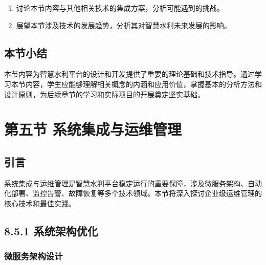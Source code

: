 \begin{enumerate}
\def\labelenumi{\arabic{enumi}.}
\tightlist
\item
  讨论本节内容与其他相关技术的集成方案，分析可能遇到的挑战。
\item
  展望本节涉及技术的发展趋势，分析其对智慧水利未来发展的影响。
\end{enumerate}

\hypertarget{ux672cux8282ux5c0fux7ed3-2}{%
\subsection{本节小结}\label{ux672cux8282ux5c0fux7ed3-2}}

本节内容为智慧水利平台的设计和开发提供了重要的理论基础和技术指导。通过学习本节内容，学生应能够理解相关概念的内涵和应用价值，掌握基本的分析方法和设计原则，为后续章节的学习和实际项目的开展奠定坚实基础。

\hypertarget{ux7b2cux4e94ux8282-ux7cfbux7edfux96c6ux6210ux4e0eux8fd0ux7ef4ux7ba1ux7406}{%
\section{第五节 系统集成与运维管理}\label{ux7b2cux4e94ux8282-ux7cfbux7edfux96c6ux6210ux4e0eux8fd0ux7ef4ux7ba1ux7406}}

\hypertarget{ux5f15ux8a00-4}{%
\subsection{引言}\label{ux5f15ux8a00-4}}

系统集成与运维管理是智慧水利平台稳定运行的重要保障，涉及微服务架构、自动化部署、监控告警、故障恢复等多个技术领域。本节将深入探讨企业级运维管理的核心技术和最佳实践。


\hypertarget{ux7cfbux7edfux67b6ux6784ux4f18ux5316}{%
\subsection{8.5.1 系统架构优化}\label{ux7cfbux7edfux67b6ux6784ux4f18ux5316}}

\hypertarget{ux5faeux670dux52a1ux67b6ux6784ux8bbeux8ba1}{%
\subsubsection{微服务架构设计}\label{ux5faeux670dux52a1ux67b6ux6784ux8bbeux8ba1}}


